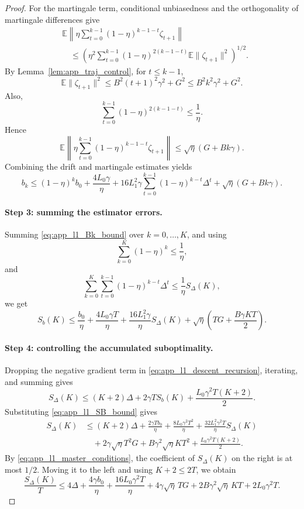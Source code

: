\documentclass[10pt,a4paper]{amsart}
\newcommand{\E}{\mathbb{E}}
\begin{document}
\begin{proof}
For the martingale term, conditional unbiasedness and the orthogonality of
martingale differences give
\[
\begin{aligned}
    &\E\left\|
    \eta\sum_{t=0}^{k-1}(1-\eta)^{k-1-t}\zeta_{t+1}
    \right\| \\
    &\quad\le
    \left(
    \eta^2\sum_{t=0}^{k-1}(1-\eta)^{2(k-1-t)}
    \E\|\zeta_{t+1}\|^2
    \right)^{1/2}.
\end{aligned}
\]
By Lemma~\ref{lem:app_traj_control}, for \(t\le k-1\),
\[
    \E\|\zeta_{t+1}\|^2
    \le
    B^2(t+1)^2\gamma^2+G^2
    \le
    B^2k^2\gamma^2+G^2.
\]
Also,
\[
    \sum_{t=0}^{k-1}(1-\eta)^{2(k-1-t)}
    \le
    \frac1\eta.
\]
Hence
\[
    \E\left\|
    \eta\sum_{t=0}^{k-1}(1-\eta)^{k-1-t}\zeta_{t+1}
    \right\|
    \le
    \sqrt{\eta}(G+Bk\gamma).
\]
Combining the drift and martingale estimates yields
\begin{equation}
\label{eq:app_l1_Bk_bound}
    b_k
    \le
    (1-\eta)^kb_0
    +\frac{4L_0\gamma}{\eta}
    +16L_1^2\gamma
    \sum_{t=0}^{k-1}(1-\eta)^{k-t}\Delta^t
    +\sqrt\eta(G+Bk\gamma).
\end{equation}

\paragraph{Step 3: summing the estimator errors.}
Summing \eqref{eq:app_l1_Bk_bound} over \(k=0,\ldots,K\), and using
\[
    \sum_{k=0}^K(1-\eta)^k\le \frac1\eta,
\]
and
\[
    \sum_{k=0}^K\sum_{t=0}^{k-1}(1-\eta)^{k-t}\Delta^t
    \le
    \frac1\eta S_\Delta(K),
\]
we get
\begin{equation}
\label{eq:app_l1_SB_bound}
    S_b(K)
    \le
    \frac{b_0}{\eta}
    +\frac{4L_0\gamma T}{\eta}
    +\frac{16L_1^2\gamma}{\eta}S_\Delta(K)
    +\sqrt\eta
    \left(TG+\frac{B\gamma KT}{2}\right).
\end{equation}

\paragraph{Step 4: controlling the accumulated suboptimality.}
Dropping the negative gradient term in
\eqref{eq:app_l1_descent_recursion}, iterating, and summing gives
\[
    S_\Delta(K)
    \le
    (K+2)\Delta
    +2\gamma T S_b(K)
    +\frac{L_0\gamma^2T(K+2)}{2}.
\]
Substituting \eqref{eq:app_l1_SB_bound} gives
\[
\begin{aligned}
S_\Delta(K)
&\le
(K+2)\Delta
+\frac{2\gamma T b_0}{\eta}
+\frac{8L_0\gamma^2T^2}{\eta}
+\frac{32L_1^2\gamma^2T}{\eta}S_\Delta(K) \\
&\quad
+2\gamma\sqrt\eta T^2G
+B\gamma^2\sqrt\eta KT^2
+\frac{L_0\gamma^2T(K+2)}{2}.
\end{aligned}
\]
By \eqref{eq:app_l1_master_conditions}, the coefficient of
\(S_\Delta(K)\) on the right is at most \(1/2\). Moving it to the left and
using \(K+2\le2T\), we obtain
\begin{equation}
\label{eq:app_l1_Sdelta_avg_bound}
\frac{S_\Delta(K)}{T}
\le
4\Delta
+\frac{4\gamma b_0}{\eta}
+\frac{16L_0\gamma^2T}{\eta}
+4\gamma\sqrt\eta\,TG
+2B\gamma^2\sqrt\eta\,KT
+2L_0\gamma^2T.
\end{equation}


\end{proof}
\end{document}
